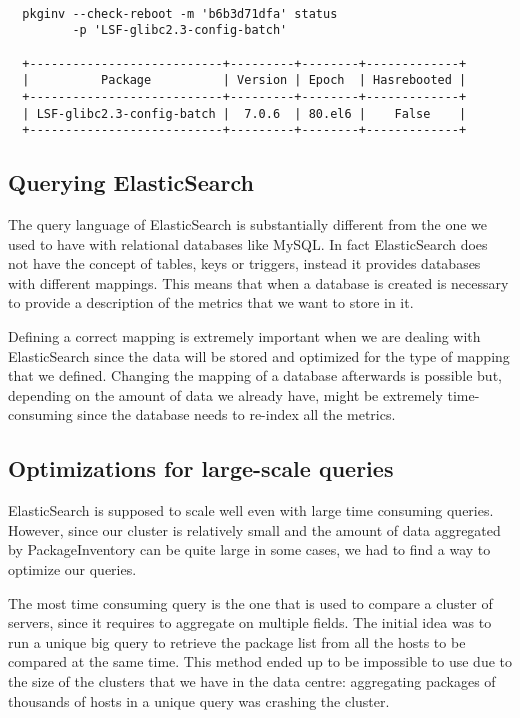 \begin{itemize}
  \begin{lstlisting}[frame=single,basicstyle=\footnotesize]
  
  pkginv --check-reboot -m 'b6b3d71dfa' status
         -p 'LSF-glibc2.3-config-batch'

  +---------------------------+---------+--------+-------------+
  |          Package          | Version | Epoch  | Hasrebooted |
  +---------------------------+---------+--------+-------------+
  | LSF-glibc2.3-config-batch |  7.0.6  | 80.el6 |    False    |
  +---------------------------+---------+--------+-------------+
  \end{lstlisting} 

\end{itemize}

\subsection{Querying ElasticSearch}

The query language of ElasticSearch is substantially different from the
one we used to have with relational databases like MySQL\@. In fact
ElasticSearch does not have the concept of tables, keys or triggers,
instead it provides databases with different mappings. This means that
when a database is created is necessary to provide a description of the
metrics that we want to store in it.

Defining a correct mapping is extremely important when we are dealing with
ElasticSearch since the data will be stored and optimized for the type of
mapping that we defined. Changing the mapping of a database afterwards is
possible but, depending on the amount of data we already have, might be
extremely time-consuming since the database needs to re-index all the
metrics.

\subsection{Optimizations for large-scale queries}

ElasticSearch is supposed to scale well even with large time consuming
queries. However, since our cluster is relatively small and the amount of
data aggregated by PackageInventory can be quite large in some cases, we
had to find a way to optimize our queries.

The most time consuming query is the one that is used to compare a cluster
of servers, since it requires to aggregate on multiple fields. The initial
idea was to run a unique big query to retrieve the package list from all
the hosts to be compared at the same time. This method ended up to be
impossible to use due to the size of the clusters that we have in the
data centre: aggregating packages of thousands of hosts in a unique query
was crashing the cluster.

